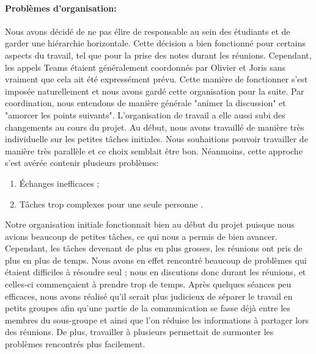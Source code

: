 \paragraph{Problèmes d'organisation:} Nous avons décidé de ne pas élire de responsable au sein des étudiants et de garder une hiérarchie horizontale. Cette décision a bien fonctionné pour certains aspects du travail, tel que pour la prise des notes durant les réunions.
Cependant, les appels Teams étaient généralement coordonnés par Olivier et Joris sans vraiment que cela ait été expressément prévu. Cette manière de fonctionner s'est imposée naturellement et nous avons gardé cette organisation pour la suite. Par coordination, nous entendons de manière générale "animer la discussion" et "amorcer les points suivants". 
L'organisation de travail a elle aussi subi des changements au cours du projet. Au début, nous avons travaillé de manière très individuelle sur les petites tâches initiales. Nous souhaitions pouvoir travailler de manière très parallèle et ce choix semblait être bon.
Néanmoins, cette approche s'est avérée contenir plusieurs problèmes:
\begin{enumerate}
    \item Échanges inefficaces \label{item:friction} ;
    \item Tâches trop complexes pour une seule personne \label{item:complex}.
\end{enumerate}
Notre organisation initiale fonctionnait bien au début du projet puisque nous avions beaucoup de petites tâches, ce qui nous a permis de bien avancer. 
Cependant, les tâches devenant de plus en plus grosses, les réunions ont pris de plus en plus de temps. 
Nous avons en effet rencontré beaucoup de problèmes qui étaient difficiles à résoudre seul ; nous en discutions donc durant les réunions, et celles-ci commençaient à prendre trop de temps.
Après quelques séances peu efficaces, nous avons réalisé qu'il serait plus judicieux de séparer le travail en petits groupes afin qu'une partie de la communication se fasse déjà entre les membres du sous-groupe et ainsi que l'on réduise les informations à partager lors des réunions. De plus, travailler à plusieurs permettait de surmonter les problèmes rencontrés plus facilement.
\paragraph{}

